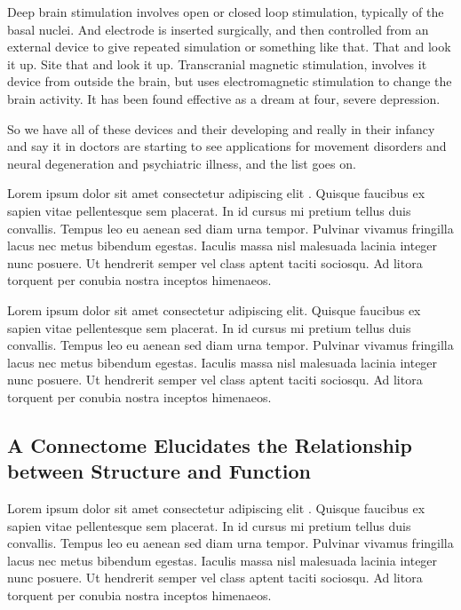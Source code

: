 \documentclass[11pt]{article}
\newcommand{\subsectionwithindent}[1]{
    \subsection*{#1}
    \hspace{\parindent} %
}
\begin{document}
Deep brain stimulation involves open or closed loop stimulation, typically of the basal nuclei. And electrode is inserted surgically, and then controlled from an external device to give repeated simulation or something like that. That and look it up. Site that and look it up. Transcranial magnetic stimulation, involves it device from outside the brain, but uses electromagnetic stimulation to change the brain activity. It has been found effective as a dream at four, severe depression.

So we have all of these devices and their developing and really in their infancy and say it in doctors are starting to see applications for movement disorders and neural degeneration and psychiatric illness, and the list goes on.


Lorem ipsum dolor sit amet consectetur adipiscing elit \cite{white1986structure, emmons2015connectomics}. Quisque faucibus ex sapien vitae pellentesque sem placerat. In id cursus mi pretium tellus duis convallis. Tempus leo eu aenean sed diam urna tempor. Pulvinar vivamus fringilla lacus nec metus bibendum egestas. Iaculis massa nisl malesuada lacinia integer nunc posuere. Ut hendrerit semper vel class aptent taciti sociosqu. Ad litora torquent per conubia nostra inceptos himenaeos.

Lorem ipsum dolor sit amet consectetur adipiscing elit. Quisque faucibus ex sapien vitae pellentesque sem placerat. In id cursus mi pretium tellus duis convallis. Tempus leo eu aenean sed diam urna tempor. Pulvinar vivamus fringilla lacus nec metus bibendum egestas. Iaculis massa nisl malesuada lacinia integer nunc posuere. Ut hendrerit semper vel class aptent taciti sociosqu. Ad litora torquent per conubia nostra inceptos himenaeos.

\subsectionwithindent{A Connectome Elucidates the Relationship between Structure and Function}
Lorem ipsum dolor sit amet consectetur adipiscing elit \cite{white1986structure, emmons2015connectomics}. Quisque faucibus ex sapien vitae pellentesque sem placerat. In id cursus mi pretium tellus duis convallis. Tempus leo eu aenean sed diam urna tempor. Pulvinar vivamus fringilla lacus nec metus bibendum egestas. Iaculis massa nisl malesuada lacinia integer nunc posuere. Ut hendrerit semper vel class aptent taciti sociosqu. Ad litora torquent per conubia nostra inceptos himenaeos.
\end{document}
